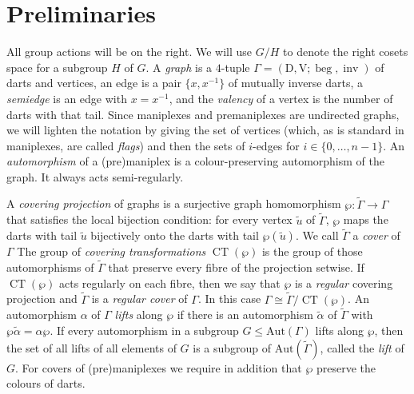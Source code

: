 \documentclass{amsart}
\theoremstyle{plain}
\theoremstyle{definition}
\newtheorem{definition}[theorem]{Definition}
\theoremstyle{remark}
\newcommand{\V}{\mathrm{V}}
\newcommand{\Aut}{\mathrm{Aut}}
\DeclareMathOperator{\CT}{CT}
\DeclareMathOperator{\beg}{beg}
\DeclareMathOperator{\inv}{inv}
\begin{document}
\section{Preliminaries}
All group actions will be on the right. We will use $G/H$ to denote the right cosets space
for a subgroup $H$ of $G$.
A \emph{graph} is
a $4$-tuple $\Gamma=(\mathrm{D},\V;\beg,\inv)$ of darts and vertices, an edge is a pair
$\{x,x^{-1}\}$ of mutually inverse darts, a \emph{semiedge} is an edge with $x=x^{-1}$,
and the \emph{valency} of a vertex is the number of darts with that tail. Since maniplexes
and premaniplexes are undirected graphs, we will lighten the notation by giving the set of
vertices (which, as is standard in maniplexes, are called \emph{flags}) and then the
sets of $i$-edges for $i \in \{0, \ldots, n-1\}$.
%
 An \emph{automorphism} of a (pre)maniplex is
a colour-preserving automorphism of the graph. It always acts semi-regularly.

A \emph{covering projection} of graphs is a surjective graph homomorphism
$\wp:\tilde\Gamma\rightarrow\Gamma$ that satisfies the local bijection condition: 
for every vertex $\tilde u$ of
$\tilde\Gamma$, $\wp$ maps the darts with tail $\tilde u$ bijectively onto the darts with tail
$\wp(\tilde u)$. We call $\tilde\Gamma$ a \emph{cover} of $\Gamma$
The group of \emph{covering transformations} $\CT(\wp)$ is the group of those automorphisms 
of $\tilde\Gamma$ that
preserve every fibre of the projection setwise. If $\CT(\wp)$ acts regularly
on each fibre, then we say that $\wp$ is a
\emph{regular} covering projection and $\tilde\Gamma$ is a \emph{regular cover} of
$\Gamma$. In this case $\Gamma\cong\tilde\Gamma/\CT(\wp)$. An automorphism $\alpha$ of
$\Gamma$ \emph{lifts} along $\wp$ if there is an automorphism $\tilde\alpha$ of
$\tilde\Gamma$ with $\wp\tilde\alpha=\alpha\wp$. If every automorphism in a subgroup
$G\le\Aut(\Gamma)$ lifts along $\wp$, then the set of all lifts of all elements of $G$ is a
subgroup of $\Aut(\tilde\Gamma)$, called the \emph{lift} of $G$.
For covers of (pre)maniplexes we require
in addition that $\wp$ preserve the colours of darts.
\end{document}
